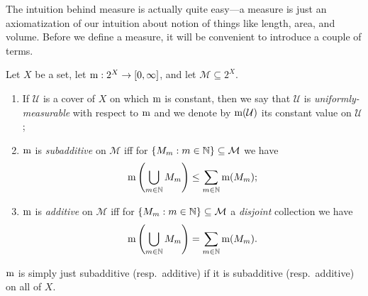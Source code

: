 The intuition behind measure is actually quite easy---a measure is just an axiomatization of our intuition about notion of things like length, area, and volume.  Before we define a measure, it will be convenient to introduce a couple of terms.
\begin{dfn}
Let $X$ be a set, let $\mathrm{m} :2^X\rightarrow [0,\infty ]$, and let $\mathcal{M}\subseteq 2^X$.  
\begin{enumerate}
\item If $\mathcal{U}$ is a cover of $X$ on which $\mathrm{m}$ is constant, then we say that $\mathcal{U}$ is \emph{uniformly-measurable} with respect to $\mathrm{m}$ and we denote by $\mathrm{m} (\mathcal{U})$ its constant value on $\mathcal{U}$;
\item $\mathrm{m}$ is \emph{subadditive} on $\mathcal{M}$ iff for $\{ M_m:m\in \mathbb{N} \} \subseteq \mathcal{M}$ we have
\begin{equation}
\mathrm{m} \left( \bigcup _{m\in \mathbb{N}}M_m\right) \leq \sum _{m\in \mathbb{N}}\mathrm{m} (M_m);
\end{equation}
\item $\mathrm{m}$ is \emph{additive} on $\mathcal{M}$ iff for $\{ M_m:m\in \mathbb{N} \} \subseteq \mathcal{M}$ a \emph{disjoint} collection we have
\begin{equation}
\mathrm{m} \left( \bigcup _{m\in \mathbb{N}}M_m\right) =\sum _{m\in \mathbb{N}}\mathrm{m} (M_m).
\end{equation}
\end{enumerate}
$\mathrm{m}$ is simply just subadditive (resp.~additive) if it is subadditive (resp.~additive) on all of $X$.
\end{dfn}
